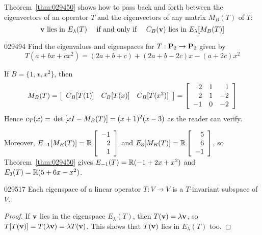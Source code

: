 \noindent Theorem~\ref{thm:029450} shows how to pass back and forth between the eigenvectors of an operator $T$ and the eigenvectors of any matrix $M_{B}(T)$ of $T$:
\begin{equation*}
\textbf{v} \mbox{ lies in } E_{\lambda}(T) \quad \mbox{ if and only if } \quad C_B(\textbf{v}) \mbox{ lies in } E_{\lambda}[M_B(T)]
\end{equation*}
\begin{example}{}{029494}
Find the eigenvalues and eigenspaces for $T : \textbf{P}_{2} \to \textbf{P}_{2}$ given by
\begin{equation*}
T(a + bx + cx^2) = (2a + b + c) + (2a + b - 2c)x - (a + 2c)x^2
\end{equation*}
\begin{solution}
If $B = \{1, x, x^{2}\}$, then
\begin{equation*}
M_B(T) = \left[ \begin{array}{ccc} C_B[T(1)] & C_B[T(x)] & C_B[T(x^2)] \end{array} \right] = \left[ \begin{array}{rrr} 2 & 1 & 1 \\ 2 & 1 & -2 \\ -1 & 0 & -2 \end{array} \right]
\end{equation*}
Hence $c_{T}(x) = \thinspace\operatorname{det\medspace}[xI - M_{B}(T)] = (x + 1)^{2}(x - 3)$ as the reader can verify.


Moreover, $E_{-1}[M_B(T)] = \mathbb{R}\left[ \begin{array}{r} -1 \\ 2 \\ 1 \end{array} \right]$ and $E_3[M_B(T)] = \mathbb{R}\left[ \begin{array}{r} 5 \\ 6 \\ -1 \end{array} \right]$, so Theorem~\ref{thm:029450} gives $E_{-1}(T) = \mathbb{R}(-1 + 2x + x^{2})$ and $E_{3}(T) = \mathbb{R}(5 + 6x - x^{2})$.
\end{solution}
\end{example}

\begin{theorem}{}{029517}
Each eigenspace of a linear operator $T : V \to V$ is a $T$-invariant subspace of $V$.
\end{theorem}

\begin{proof}
If $\textbf{v}$ lies in the eigenspace $E_{\lambda}(T)$, then $T(\textbf{v}) = \lambda\textbf{v}$, so $T[T(\textbf{v})] = T(\lambda\textbf{v}) = {\lambda}T(\textbf{v})$. This shows that $T(\textbf{v})$ lies in $E_{\lambda}(T)$ too.
\end{proof}


